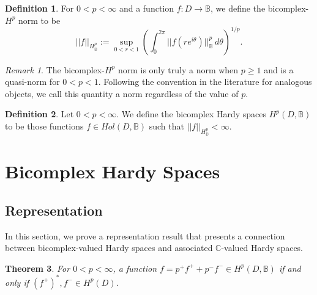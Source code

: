 \documentclass[suppldata]{interact}
\theoremstyle{plain}%
\newtheorem{theorem}{Theorem}[section]
\theoremstyle{definition}
\newtheorem{deff}[theorem]{Definition}
\theoremstyle{remark}
\newtheorem{comm}{Remark}
\newcommand{\bc}{\mathbb{B}}
\newcommand{\holb}{Hol(D,\bc)}
\newcommand{\hpb}{H^p(D,\bc)}
\begin{document}
\begin{deff}
    For $0 < p < \infty$ and a function $f: D \to \bc$, we define the bicomplex-$H^p$ norm to be
    \[
        ||f||_{H^p_{\bc}} := \sup_{0 < r < 1}\left( \int_0^{2\pi} ||f(re^{i\theta})||^p_{\bc} \,d\theta\right)^{1/p}.
    \]
\end{deff}


\begin{comm}
    The bicomplex-$H^p$ norm is only truly a norm when $p \geq 1$ and is a quasi-norm for $0 < p < 1$. Following the convention in the literature for analogous objects, we call this quantity a norm regardless of the value of $p$.  
\end{comm}

\begin{deff}
    Let $0 < p < \infty$. We define the bicomplex Hardy spaces $\hpb$ to be those functions $f \in \holb$ such that 
    $||f||_{H^p_{\bc}} < \infty$.
\end{deff}

\section{Bicomplex Hardy Spaces}\label{bcholohardysection}



\subsection{Representation}

In this section, we prove a representation result that presents a connection between bicomplex-valued Hardy spaces and associated $\mathbb{C}$-valued Hardy spaces. 

\begin{theorem}\label{thm: bchardyrep}
    For $0 < p < \infty$, a function $f = p^+f^+ + p^-f^- \in \hpb$ if and only if $(f^+)^*,f^- \in H^p(D)$. 
\end{theorem}
\end{document}
